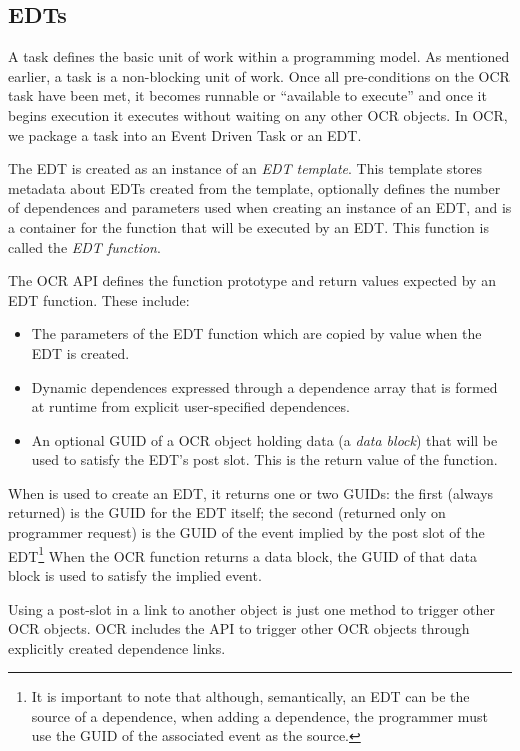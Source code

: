 \subsection{EDTs}
\label{sec:EDT}

A task defines the basic unit of work within a programming model. As
mentioned earlier, a task is a non-blocking unit of work. Once all
pre-conditions on the OCR task have been met, it becomes
runnable or ``available to execute'' and once it
begins execution it executes without waiting on any other OCR
objects. In OCR, we package a task into an Event Driven
Task or an EDT.

The EDT is created as an instance of an \emph{EDT template}. This template stores metadata about EDTs created from the
template, optionally defines the number of dependences and parameters
used when creating an instance of an EDT, and is a container for the
function that will be executed by an EDT. This function is called the
\emph{EDT function}.

The OCR API defines the function prototype and return values expected
by an EDT function. These include:
\begin{itemize}
\item The parameters of the EDT function which are copied by value
when the EDT is created.
\item Dynamic dependences expressed through a dependence array that is
formed at runtime from explicit user-specified dependences.
\item An optional GUID of a OCR object holding data (a \emph{data
block}) that will be used to satisfy the EDT’s post slot. This is the
return value of the function.
\end{itemize}
When  is used to create an EDT, it returns one or
two GUIDs: the first (always returned) is the GUID for the EDT itself;
the second (returned only on programmer request) is the GUID of the
event implied by the post slot of the EDT\footnote{It is important to
  note that although, semantically, an EDT can be the source of a
  dependence, when adding a dependence, the programmer must use the
  GUID of the associated event as the source.}
When the OCR function returns a data block, the GUID of
that data block is used to satisfy the implied event.

Using a post-slot in a link to another object is just one method to
trigger other OCR objects. OCR includes the 
API to trigger other OCR objects through explicitly created dependence
links.

